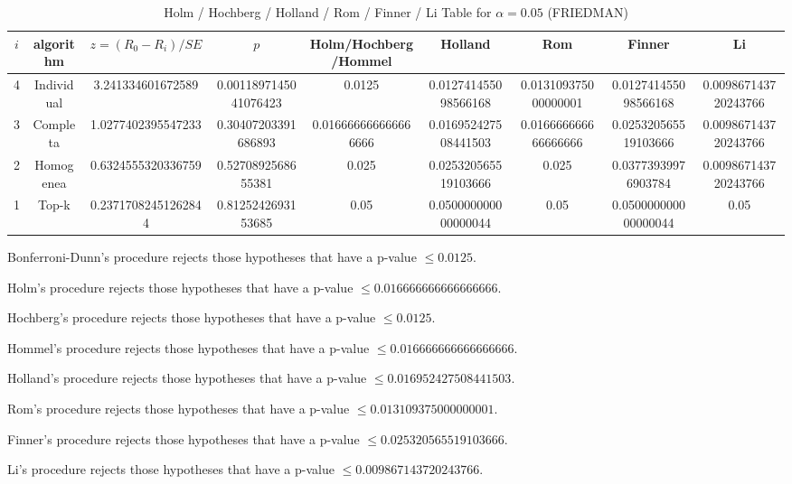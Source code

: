 \documentclass[a4paper,10pt]{article}
\begin{document}
\begin{landscape}
\begin{table}[!htp]
\centering\scriptsize
\caption{Holm / Hochberg / Holland / Rom / Finner / Li Table for $\alpha=0.05$ (FRIEDMAN)}
\begin{tabular}{ccccccccc}
$i$&algorithm&$z=(R_0 - R_i)/SE$&$p$&Holm/Hochberg/Hommel&Holland&Rom&Finner&Li\\
\hline
4&Individual&3.241334601672589&0.0011897145041076423&0.0125&0.012741455098566168&0.013109375000000001&0.012741455098566168&0.009867143720243766\\
3&Completa&1.0277402395547233&0.30407203391686893&0.016666666666666666&0.016952427508441503&0.016666666666666666&0.025320565519103666&0.009867143720243766\\
2&Homogenea&0.6324555320336759&0.5270892568655381&0.025&0.025320565519103666&0.025&0.03773939976903784&0.009867143720243766\\
1&Top-k&0.23717082451262844&0.8125242693153685&0.05&0.050000000000000044&0.05&0.050000000000000044&0.05\\
\hline
\end{tabular}
\end{table}
Bonferroni-Dunn's procedure rejects those hypotheses that have a p-value $\le0.0125$.


Holm's procedure rejects those hypotheses that have a p-value $\le0.016666666666666666$.


Hochberg's procedure rejects those hypotheses that have a p-value $\le0.0125$.


Hommel's procedure rejects those hypotheses that have a p-value $\le0.016666666666666666$.


Holland's procedure rejects those hypotheses that have a p-value $\le0.016952427508441503$.


Rom's procedure rejects those hypotheses that have a p-value $\le0.013109375000000001$.


Finner's procedure rejects those hypotheses that have a p-value $\le0.025320565519103666$.


Li's procedure rejects those hypotheses that have a p-value $\le0.009867143720243766$.



\newpage


\end{landscape}
\end{document}
